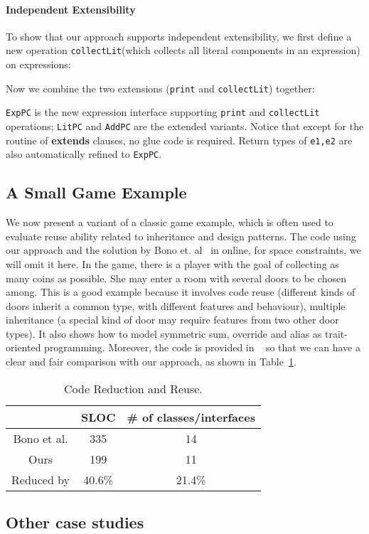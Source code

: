 \paragraph{Independent Extensibility}
To show that our approach supports independent extensibility, we first define a
new operation \texttt{collectLit}(which collects all
literal components in an expression) on expressions: 


\noindent Now we combine the two extensions (\texttt{print} and
\texttt{collectLit}) together:


\noindent \texttt{ExpPC} is the new expression interface supporting
\texttt{print} and \texttt{collectLit} operations; \texttt{LitPC} and
\texttt{AddPC} are the extended variants. Notice that except for the routine of
\textbf{extends} clauses, no glue code is required. Return types of
\texttt{e1,e2} are also automatically refined to \texttt{ExpPC}.

\subsection{A Small Game Example}
We now present a variant of a classic game example, which is often used to
evaluate reuse ability related to inheritance and design patterns. The code
using our approach and the solution by Bono et. al~\cite{bono14} in online, for
space constraints, we will omit it here. In the game, there is a player with the
goal of collecting as many coins as possible. She may enter a room with several
doors to be chosen among. This is a good example because it involves code reuse
(different kinds of doors inherit a common type, with different features and
behaviour), multiple inheritance (a special kind of door may require features
from two other door types). It also shows how to model symmetric sum, override
and alias as trait-oriented programming. Moreover, the code is provided in
~\cite{bono14} so that we can have a clear and fair comparison with our
approach, as shown in Table~\ref{table:codereduction}.

\begin{table}[h]
\centering
\begin{tabular}{ccc}
\hline
            & SLOC   & \# of classes/interfaces \\ \hline
Bono et al. & 335    & 14                       \\
Ours        & 199    & 11                       \\
\rowcolor[HTML]{C0C0C0} 
Reduced by  & 40.6\% & 21.4\%                   \\ \hline
\end{tabular}
\caption{Code Reduction and Reuse.}
\label{table:codereduction}
\end{table}


\subsection{Other case studies}

